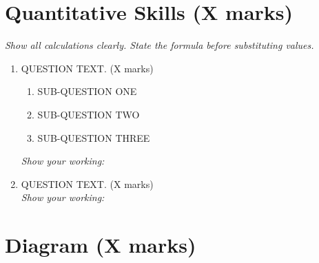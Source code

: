 \newpage

\section*{Quantitative Skills (X marks)}

\textit{Show all calculations clearly. State the formula before substituting values.}

\vspace{0.5em}

\begin{enumerate}[leftmargin=*, label=\textbf{\arabic*.}]

    \item QUESTION TEXT. \hfill (X marks)
    \begin{enumerate}[label=(\roman*), topsep=4pt]
        \item SUB-QUESTION ONE
        \item SUB-QUESTION TWO
        \item SUB-QUESTION THREE
    \end{enumerate}

    \vspace{0.3em}
    \textit{Show your working:}
    \vspace{3cm}

    \vspace{0.5em}

    \item QUESTION TEXT. \hfill (X marks)\\
    \textit{Show your working:}
    \vspace{3cm}

\end{enumerate}

\newpage

\section*{Diagram (X marks)}

